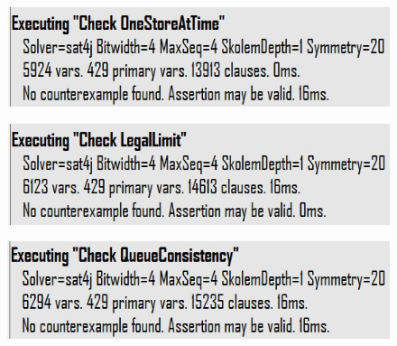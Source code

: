 \documentclass[]{article}
\begin{document}
		\begin{figure}[H]

								\includegraphics[scale=0.9]{OneStoreAtTime.jpg}
								
	\end{figure}
			\begin{figure}[H]

								\includegraphics[scale=0.9]{LegalLimit.jpg}
								
	\end{figure}
			\begin{figure}[H]

								\includegraphics[scale=0.9]{QueueConsistency.jpg}
								
	\end{figure}
\end{document}
